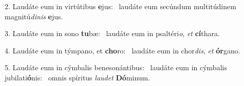 2. Laudáte eum in virtútibus \textbf{e}jus: \ast\  laudáte eum secúndum multitúdinem magnitú\textit{di}\textit{nis} \textbf{e}jus.\

3. Laudáte eum in sono \textbf{tu}bæ: \ast\  laudáte eum in psaltéri\textit{o}, \textit{et} \textbf{cí}thara.\

4. Laudáte eum in týmpano, et \textbf{cho}ro: \ast\  laudáte eum in chor\textit{dis}, \textit{et} \textbf{ór}gano.\

5. Laudáte eum in cýmbalis benesonántibus: \dag\  laudáte eum in cýmbalis jubilati\textbf{ó}nis: \ast\  omnis spíritus \textit{lau}\textit{det} \textbf{Dó}minum.\

